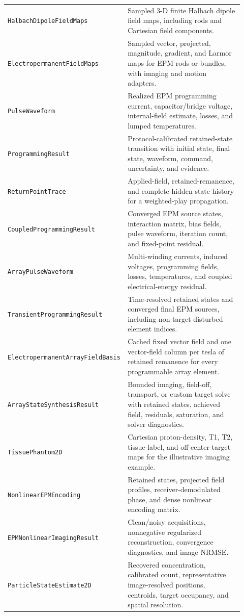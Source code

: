 \documentclass[11pt,oneside]{report}
\newcommand{\code}[1]{\texttt{#1}}
\begin{document}
\begin{longtable}{p{0.43\linewidth}p{0.49\linewidth}}
\code{HalbachDipoleFieldMaps} & Sampled 3-D finite Halbach dipole field maps, including rods and Cartesian field components. \\
\code{ElectropermanentFieldMaps} & Sampled vector, projected, magnitude, gradient, and Larmor maps for EPM rods or bundles, with imaging and motion adapters. \\
\code{PulseWaveform} & Realized EPM programming current, capacitor/bridge voltage, internal-field estimate, losses, and lumped temperatures. \\
\code{ProgrammingResult} & Protocol-calibrated retained-state transition with initial state, final state, waveform, command, uncertainty, and evidence. \\
\code{ReturnPointTrace} & Applied-field, retained-remanence, and complete hidden-state history for a weighted-play propagation. \\
\code{CoupledProgrammingResult} & Converged EPM source states, interaction matrix, bias fields, pulse waveform, iteration count, and fixed-point residual. \\
\code{ArrayPulseWaveform} & Multi-winding currents, induced voltages, programming fields, losses, temperatures, and coupled electrical-energy residual. \\
\code{TransientProgrammingResult} & Time-resolved retained states and converged final EPM sources, including non-target disturbed-element indices. \\
\code{ElectropermanentArrayFieldBasis} & Cached fixed vector field and one vector-field column per tesla of retained remanence for every programmable array element. \\
\code{ArrayStateSynthesisResult} & Bounded imaging, field-off, transport, or custom target solve with retained states, achieved field, residuals, saturation, and solver diagnostics. \\
\code{TissuePhantom2D} & Cartesian proton-density, T1, T2, tissue-label, and off-center-target maps for the illustrative imaging example. \\
\code{NonlinearEPMEncoding} & Retained states, projected field profiles, receiver-demodulated phase, and dense nonlinear encoding matrix. \\
\code{EPMNonlinearImagingResult} & Clean/noisy acquisitions, nonnegative regularized reconstruction, convergence diagnostics, and image NRMSE. \\
\code{ParticleStateEstimate2D} & Recovered concentration, calibrated count, representative image-resolved positions, centroids, target occupancy, and spatial resolution. \\

\end{longtable}
\end{document}
